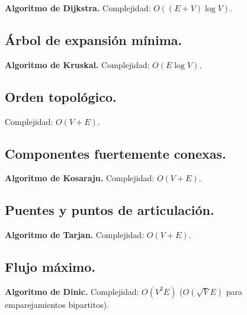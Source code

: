 \documentclass[10pt, letterpaper, twoside]{article}
\begin{document}
\textbf{Algoritmo de Dijkstra.} Complejidad: $O((E + V) \log V)$.



\subsection{Árbol de expansión mínima.}

\textbf{Algoritmo de Kruskal.} Complejidad: $O(E \log V)$.



\subsection{Orden topológico.}

Complejidad: $O(V + E)$.



\subsection{Componentes fuertemente conexas.}

\textbf{Algoritmo de Kosaraju.} Complejidad: $O(V + E)$.



\subsection{Puentes y puntos de articulación.}

\textbf{Algoritmo de Tarjan.} Complejidad: $O(V + E)$.



\subsection{Flujo máximo.}

\textbf{Algoritmo de Dinic.} Complejidad: $O(V^2 E)$ ($O(\sqrt{V} E)$ para emparejamientos bipartitos).



%
%
%
\end{document}

